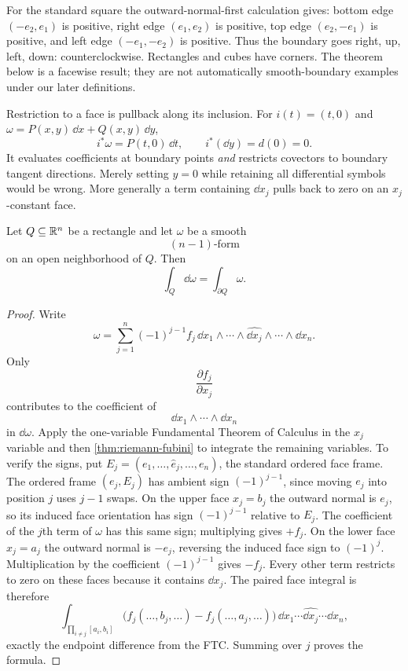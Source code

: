For the standard square the outward-normal-first calculation gives:
bottom edge $(-e_2,e_1)$ is positive, right edge $(e_1,e_2)$ is positive,
top edge $(e_2,-e_1)$ is positive, and left edge $(-e_1,-e_2)$ is positive.
Thus the boundary goes right, up, left, down: counterclockwise.
Rectangles and cubes have corners. The theorem below is a facewise result;
they are not automatically smooth-boundary examples under our later definitions.

Restriction to a face is pullback along its inclusion. For
$i(t)=(t,0)$ and $\omega=P(x,y)\,\dd x+Q(x,y)\,\dd y$,
\[
i^*\omega=P(t,0)\,\dd t,
\qquad i^*(\dd y)=d(0)=0.
\]
It evaluates coefficients at boundary points \emph{and} restricts covectors
to boundary tangent directions. Merely setting $y=0$ while retaining
all differential symbols would be wrong. More generally a term containing
$\dd x_j$ pulls back to zero on an $x_j$-constant face.


\begin{theorem}
\label{thm:local-stokes}
Let $Q\subseteq\mathbb{R}^n$ be a rectangle and let $\omega$ be a smooth
\[
(n-1)\text{-form}
\]
on an open neighborhood of $Q$.  Then
\[
\int_Q\dd\omega=\int_{\partial Q}\omega.
\]
\end{theorem}
\begin{proof}
Write
\[
\omega=
\sum_{j=1}^{n}(-1)^{j-1}f_j\,
\dd x_1\wedge\cdots\wedge\widehat{\dd x_j}\wedge\cdots\wedge\dd x_n.
\]
Only
\[
\frac{\partial f_j}{\partial x_j}
\]
contributes to the coefficient of
\[
\dd x_1\wedge\cdots\wedge\dd x_n
\]
in $\dd\omega$.  Apply the one-variable Fundamental Theorem of Calculus in
the $x_j$ variable and then \cref{thm:riemann-fubini} to integrate the
remaining variables. To verify the signs, put
$E_j=(e_1,\ldots,\widehat e_j,\ldots,e_n)$, the standard ordered face frame.
The ordered frame $(e_j,E_j)$ has ambient sign $(-1)^{j-1}$, since
moving $e_j$ into position $j$ uses $j-1$ swaps. On the upper face
$x_j=b_j$ the outward normal is $e_j$, so its induced face orientation
has sign $(-1)^{j-1}$ relative to $E_j$. The coefficient of the $j$th
term of $\omega$ has this same sign; multiplying gives $+f_j$.
On the lower face $x_j=a_j$ the outward normal is $-e_j$, reversing
the induced face sign to $(-1)^j$. Multiplication by the coefficient
$(-1)^{j-1}$ gives $-f_j$. Every other term restricts to zero on these
faces because it contains $\dd x_j$. The paired face integral is therefore
\[
\int_{\prod_{i\ne j}[a_i,b_i]}
\bigl(f_j(\ldots,b_j,\ldots)-f_j(\ldots,a_j,\ldots)\bigr)
\,\dd x_1\cdots\widehat{\dd x_j}\cdots\dd x_n,
\]
exactly the endpoint difference from the FTC. Summing over $j$ proves the formula.
\end{proof}

